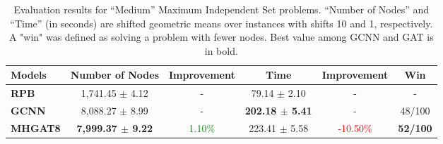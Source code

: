 \begin{table*}[htb!]
    \centering
    \begin{tabular}{|l c c c c c|}
        \hline
        \textbf{Models} & \textbf{Number of Nodes} & \textbf{Improvement} & \textbf{Time} & \textbf{Improvement} & \textbf{Win}\\
        \hline
        \textbf{RPB} & 1,741.45 $\pm$ 4.12 & - & 79.14 $\pm$ 2.10 & - & -\\
        \hline
        \textbf{GCNN} & 8,088.27 $\pm$ 8.99 & - & \textbf{202.18 $\pm$ 5.41} & - & 48/100\\
        \textbf{MHGAT8} & \textbf{7,999.37 $\pm$ 9.22} & \textcolor{green}{1.10\%} & 223.41 $\pm$ 5.58 & \textcolor{red}{-10.50\%} & \textbf{52/100}\\
        \hline
    \end{tabular}
    \caption{Evaluation results for “Medium” Maximum Independent Set problems. “Number of Nodes” and “Time” (in seconds) are shifted geometric means over instances with shifts 10 and 1, respectively.
    A "win" was defined as solving a problem with fewer nodes.
    Best value among GCNN and GAT is in bold.}
    \label{tab:is-results-medium}
\end{table*}